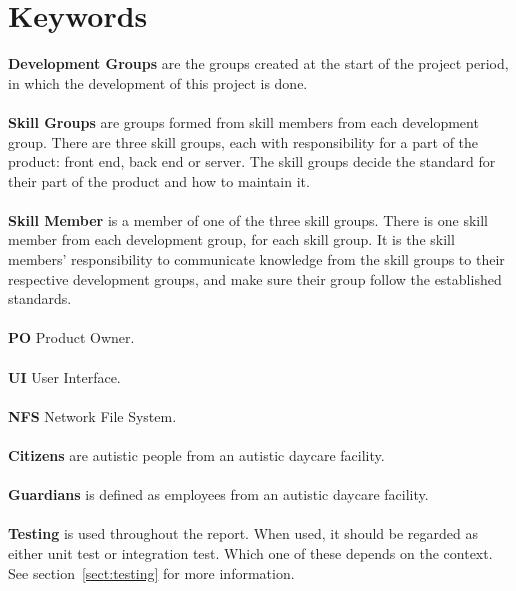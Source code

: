 

\section*{Keywords}
\textbf{Development Groups} are the groups created at the start of the project period, in which the development of this project is done.\\\\
\textbf{Skill Groups} are groups formed from skill members from each development group. There are three skill groups, each with responsibility for a part of the product: front end, back end or server. The skill groups decide the standard for their part of the product and how to maintain it.\\\\
\textbf{Skill Member} is a member of one of the three skill groups. There is one skill member from each development group, for each skill group. It is the skill members' responsibility to communicate knowledge from the skill groups to their respective development groups, and make sure their group follow the established standards.\\\\
\textbf{PO} Product Owner.\\\\
\textbf{UI} User Interface.\\\\
\textbf{NFS} Network File System.\\\\
\textbf{Citizens} are autistic people from an autistic daycare facility.\\\\
\textbf{Guardians} is defined as employees from an autistic daycare facility.\\\\
\textbf{Testing} is used throughout the report. When used, it should be regarded as either unit test or integration test. Which one of these depends on the context. See section~\ref{sect:testing} for more information.
